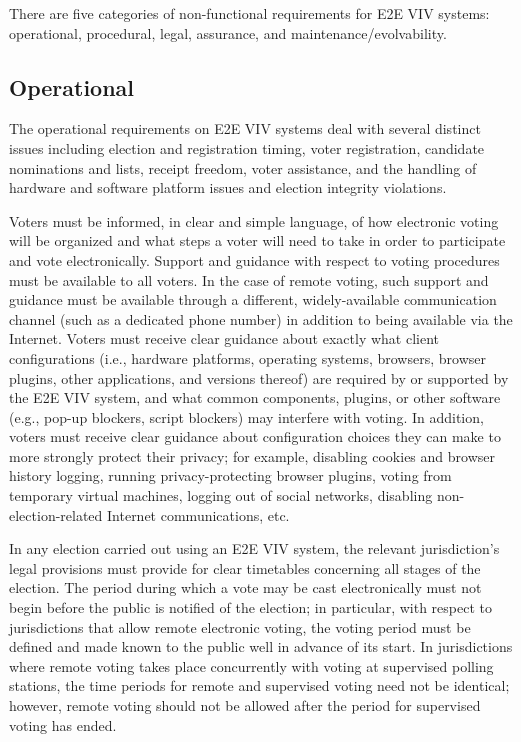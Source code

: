There are five categories of non-functional requirements for E2E VIV
systems: operational, procedural, legal, assurance, and
maintenance/evolvability.

\subsection{Operational}
\label{req:operational}

The operational requirements on E2E VIV systems deal with several
distinct issues including election and registration timing, voter
registration, candidate nominations and lists, receipt freedom, voter
assistance, and the handling of hardware and software platform issues
and election integrity violations.

Voters must be informed, in clear and simple language, of how
electronic voting will be organized and what steps a voter will need
to take in order to participate and vote electronically. Support and
guidance with respect to voting procedures must be available to all
voters. In the case of remote voting, such support and guidance must
be available through a different, widely-available communication
channel (such as a dedicated phone number) in addition to being
available via the Internet. Voters must receive clear guidance about
exactly what client configurations (i.e., hardware platforms,
operating systems, browsers, browser plugins, other applications, and
versions thereof) are required by or supported by the E2E VIV system,
and what common components, plugins, or other software (e.g., pop-up
blockers, script blockers) may interfere with voting. In addition,
voters must receive clear guidance about configuration choices they
can make to more strongly protect their privacy; for example,
disabling cookies and browser history logging, running
privacy-protecting browser plugins, voting from temporary virtual
machines, logging out of social networks, disabling
non-election-related Internet communications, etc.

In any election carried out using an E2E VIV system, the relevant
jurisdiction's legal provisions must provide for clear timetables
concerning all stages of the election. The period during which a vote
may be cast electronically must not begin before the public is
notified of the election; in particular, with respect to jurisdictions
that allow remote electronic voting, the voting period must be defined
and made known to the public well in advance of its start. In
jurisdictions where remote voting takes place concurrently with voting
at supervised polling stations, the time periods for remote and
supervised voting need not be identical; however, remote voting should
not be allowed after the period for supervised voting has ended.

